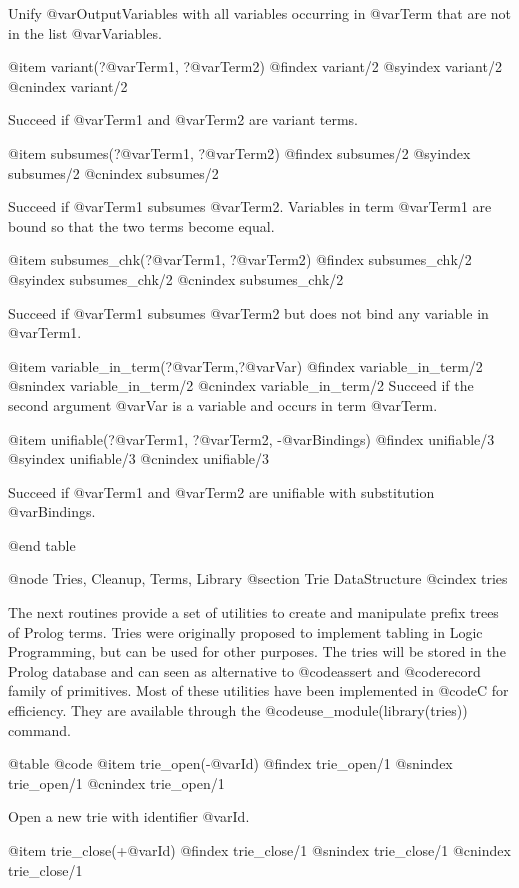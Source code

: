 {{{{{{{{{Unify @var{OutputVariables} with all variables occurring in @var{Term} that are not in the list @var{Variables}.

@item variant(?@var{Term1}, ?@var{Term2})
@findex  variant/2
@syindex variant/2
@cnindex variant/2

Succeed if @var{Term1} and @var{Term2} are variant terms.

@item subsumes(?@var{Term1}, ?@var{Term2})
@findex  subsumes/2
@syindex subsumes/2
@cnindex subsumes/2

Succeed if @var{Term1} subsumes @var{Term2}.  Variables in term
@var{Term1} are bound so that the two terms become equal.


@item subsumes_chk(?@var{Term1}, ?@var{Term2})
@findex  subsumes_chk/2
@syindex subsumes_chk/2
@cnindex subsumes_chk/2

Succeed if @var{Term1} subsumes @var{Term2} but does not bind any
variable in @var{Term1}.

@item variable_in_term(?@var{Term},?@var{Var})
@findex variable_in_term/2
@snindex variable_in_term/2
@cnindex variable_in_term/2
Succeed if the second argument @var{Var} is a variable and occurs in
term @var{Term}.

@item unifiable(?@var{Term1}, ?@var{Term2}, -@var{Bindings})
@findex  unifiable/3
@syindex unifiable/3
@cnindex unifiable/3

Succeed if @var{Term1} and @var{Term2} are unifiable with substitution
@var{Bindings}.

@end table

@node Tries, Cleanup, Terms, Library
@section Trie DataStructure
@cindex tries

The next routines provide a set of utilities to create and manipulate
prefix trees of Prolog terms. Tries were originally proposed to
implement tabling in Logic Programming, but can be used for other
purposes. The tries will be stored in the Prolog database and can seen
as alternative to @code{assert} and @code{record} family of
primitives. Most of these utilities have been implemented in @code{C}
for efficiency. They are available through the
@code{use_module(library(tries))} command.

@table @code
@item trie_open(-@var{Id})
@findex trie_open/1
@snindex trie_open/1
@cnindex trie_open/1

Open a new trie with identifier @var{Id}.

@item trie_close(+@var{Id})
@findex trie_close/1
@snindex trie_close/1
@cnindex trie_close/1

}}}}}}}}}
